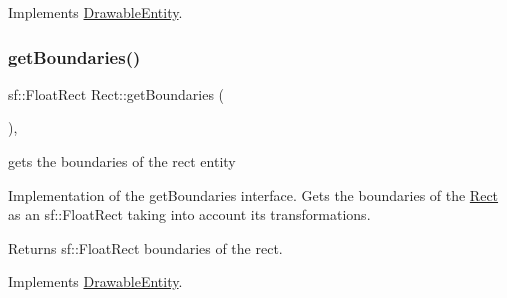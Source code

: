 Implements \hyperlink{class_drawable_entity_a0b0db9c1325defed216d66a5b4cc755e}{Drawable\+Entity}.

\mbox{\label{class_rect_a17056b26af5522b024e9628386d34335}} 
\subsubsection{\texorpdfstring{get\+Boundaries()}{getBoundaries()}}
{\footnotesize\ttfamily sf\+::\+Float\+Rect Rect\+::get\+Boundaries (\begin{DoxyParamCaption}{ }\end{DoxyParamCaption})\hspace{0.3cm}{\ttfamily [override]}, {\ttfamily [virtual]}}



gets the boundaries of the rect entity 

Implementation of the get\+Boundaries interface. Gets the boundaries of the \hyperlink{class_rect}{Rect} as an sf\+::\+Float\+Rect taking into account it\textquotesingle{}s transformations.

\begin{DoxyReturn}{Returns}
sf\+::\+Float\+Rect boundaries of the rect. 
\end{DoxyReturn}


Implements \hyperlink{class_drawable_entity_a352a101e3be05d25e1a10e5f72ccb9e3}{Drawable\+Entity}.

\mbox{\label{class_rect_aa780623e4639a2679ed300424142d50d}} 
